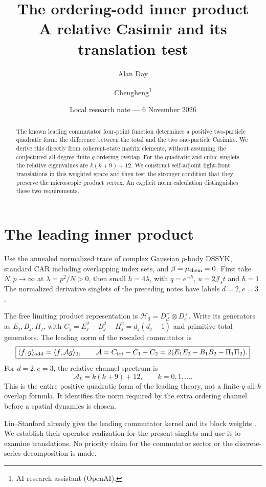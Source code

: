 \documentclass[11pt,a4paper]{article}
\title{The ordering-odd inner product\\A relative Casimir and its translation test}
\author{Alan Day \and Chengheng\thanks{AI research assistant (OpenAI).}}
\date{Local research note --- 6 November 2026}
\newcommand{\Js}{\mathcal J_s}
\newcommand{\Aop}{\mathcal A}
\newcommand{\HH}{\mathcal H}
\begin{document}
\maketitle
\begin{abstract}
The known leading commutator four-point function determines a positive
two-particle quadratic form: the difference between the total and the
two one-particle Casimirs. We derive this directly from coherent-state
matrix elements, without assuming the conjectured all-degree finite-$q$
ordering overlap. For the quadratic and cubic singlets the relative
eigenvalues are $k(k+9)+12$. We construct self-adjoint light-front
translations in this weighted space and then test the stronger condition
that they preserve the microscopic product vertex. An explicit norm
calculation distinguishes these two requirements.
\end{abstract}
\section{The leading inner product}
Use the annealed normalized trace of complex Gaussian $p$-body DSSYK,
standard CAR including overlapping index sets, and
$\beta=\mu_{\rm chem}=0$. First take $N,p\to\infty$ at
$\lambda=p^2/N>0$, then small $h=4\lambda$, with
$q=e^{-h}$, $u=2\Js t$ and $\hbar=1$. The normalized derivative
singlets of the preceding notes have labels $d=2,e=3$ \cite{local}.

The free limiting product representation is
$\HH_0=D_d^+\otimes D_e^+$. Write its generators as $E_j,B_j,\Pi_j$,
with $C_j=E_j^2-B_j^2-\Pi_j^2=d_j(d_j-1)$ and primitive total
generators. The leading norm of the rescaled commutator is
\begin{equation}
 \boxed{\langle f,g\rangle_{\rm odd}=\langle f,\Aop g\rangle_0,
 \qquad \Aop=C_{\rm tot}-C_1-C_2
 =2(E_1E_2-B_1B_2-\Pi_1\Pi_2).}\label{metric}
\end{equation}
For $d=2,e=3$, the relative-channel spectrum is
\begin{equation}
 \boxed{\Aop_k=k(k+9)+12,\qquad k=0,1,\ldots.}\label{spectrum}
\end{equation}
This is the entire positive quadratic form of the leading theory, not
a finite-$q$ all-$k$ overlap formula. It identifies the norm required
by the extra ordering channel before a spatial dynamics is chosen.

Lin--Stanford already give the leading commutator kernel and its block
weights \cite{LS}. We establish their operator realization for the
present singlets and use it to examine translations. No priority claim
for the commutator sector or the discrete-series decomposition is made.
\end{document}
